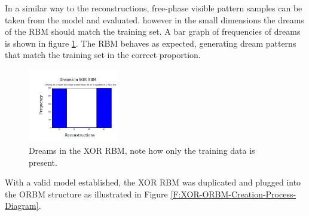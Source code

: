 In a similar way to the reconstructions, free-phase visible pattern samples can be taken from the model and evaluated.  however in the small dimensions the dreams of the RBM should match the training set. A bar graph of frequencies of dreams is shown in figure \ref{F:Two-Bit-RBM-Dreams}. The RBM behaves as expected, generating dream patterns that match the training set in the correct proportion.
\begin{figure}
  \begin{center}
    \includegraphics[width=0.35\textwidth]{Assets/XOR-RBM-Dreams.png}
  \end{center}
  \caption{Dreams in the XOR RBM, note how only the training data is present.}
  \label{F:Two-Bit-RBM-Dreams}
\end{figure}
With a valid model established, the XOR RBM was duplicated and plugged into the ORBM structure as illustrated in Figure \ref{F:XOR-ORBM-Creation-Process-Diagram}.



